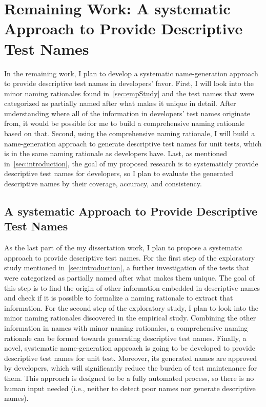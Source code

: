 \section{Remaining Work: A systematic Approach to Provide Descriptive Test Names}
\label{sec:remaining-work}

In the remaining work, I plan to develop a systematic name-generation approach to provide descriptive test names in developers' favor.
%
First, I will look into the minor naming rationales found in~\cref{sec:empStudy} and the test names that were categorized as partially named after what makes it unique in detail.
%
After understanding where all of the information in developers' test names originate from, it would be possible for me to build a comprehensive naming rationale based on that.
%
Second, using the comprehensive naming rationale, I will build a name-generation approach to generate descriptive test names for unit tests, which is in the same naming rationale as developers have.
%
Last, as mentioned in~\cref{sec:introduction}, the goal of my proposed research is to systematicly provide descriptive test names for developers, so I plan to evaluate the generated descriptive names by their coverage, accuracy, and consistency.


\subsection{A systematic Approach to Provide Descriptive Test Names}

As the last part of the my dissertation work, I plan to propose a systematic approach to provide descriptive test names.
%
For the first step of the exploratory study mentioned in~\cref{sec:introduction}, a further investigation of the tests that were categorized as partially named after what makes them unique.
%
The goal of this step is to find the origin of other information embedded in descriptive names and check if it is possible to formalize a naming rationale to extract that information.
%
For the second step of the exploratory study, I plan to look into the minor naming rationales discovered in the empirical study.
%
Combining the other information in names with minor naming rationales, a comprehensive naming rationale can be formed towards generating descriptive test names.
%
Finally, a novel, systematic name-generation approach is going to be developed to provide descriptive test names for unit test.
%
Moreover, its generated names are approved by developers, which will significantly reduce the burden of test maintenance for them.
%
This approach is designed to be a fully automated process, so there is no human input needed (i.e., neither to detect poor names nor generate descriptive names).


